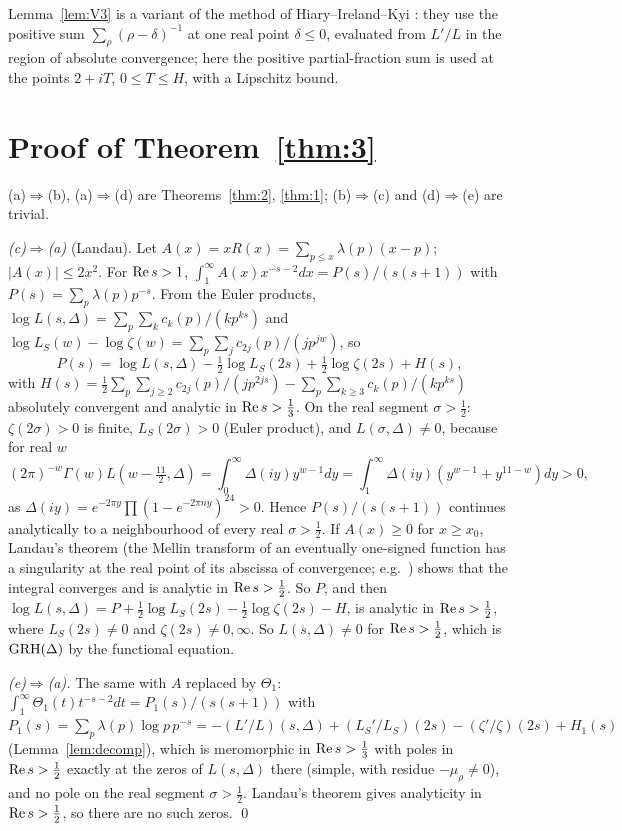 Lemma~\ref{lem:V3} is a variant of the method of Hiary--Ireland--Kyi \cite{HIK}: they use the positive sum $\sum_\rho(\rho-\delta)^{-1}$ at one real point $\delta\le0$, evaluated from $L'/L$ in the region of absolute convergence; here the positive partial-fraction sum is used at the points $2+iT$, $0\le T\le H$, with a Lipschitz bound.

\section{Proof of Theorem~\ref{thm:3}}\label{sec:proof3}

(a)$\Rightarrow$(b), (a)$\Rightarrow$(d) are Theorems~\ref{thm:2}, \ref{thm:1}; (b)$\Rightarrow$(c) and (d)$\Rightarrow$(e) are trivial.

\emph{(c)$\Rightarrow$(a)} (Landau). Let $A(x)=xR(x)=\sum_{p\le x}\lambda(p)(x-p)$; $|A(x)|\le2x^2$. For $\operatorname{Re} s>1$, $\int_1^\infty A(x)x^{-s-2}dx=P(s)/(s(s+1))$ with $P(s)=\sum_p\lambda(p)p^{-s}$. From the Euler products, $\log L(s,\Delta)=\sum_p\sum_kc_k(p)/(kp^{ks})$ and $\log L_S(w)-\log\zeta(w)=\sum_p\sum_jc_{2j}(p)/(jp^{jw})$, so
\[
P(s)=\log L(s,\Delta)-\tfrac12\log L_S(2s)+\tfrac12\log\zeta(2s)+H(s),
\]
with $H(s)=\frac12\sum_p\sum_{j\ge2}c_{2j}(p)/(jp^{2js})-\sum_p\sum_{k\ge3}c_k(p)/(kp^{ks})$ absolutely convergent and analytic in $\operatorname{Re} s>\frac13$. On the real segment $\sigma>\frac12$: $\zeta(2\sigma)>0$ is finite, $L_S(2\sigma)>0$ (Euler product), and $L(\sigma,\Delta)\ne0$, because for real $w$
\[
(2\pi)^{-w}\Gamma(w)L(w-\tfrac{11}2,\Delta)=\int_0^\infty\Delta(iy)y^{w-1}dy=\int_1^\infty\Delta(iy)(y^{w-1}+y^{11-w})dy>0,
\]
as $\Delta(iy)=e^{-2\pi y}\prod(1-e^{-2\pi ny})^{24}>0$. Hence $P(s)/(s(s+1))$ continues analytically to a neighbourhood of every real $\sigma>\frac12$. If $A(x)\ge0$ for $x\ge x_0$, Landau's theorem (the Mellin transform of an eventually one-signed function has a singularity at the real point of its abscissa of convergence; e.g.\ \cite[\S15.1]{MV}) shows that the integral converges and is analytic in $\operatorname{Re} s>\frac12$. So $P$, and then $\log L(s,\Delta)=P+\frac12\log L_S(2s)-\frac12\log\zeta(2s)-H$, is analytic in $\operatorname{Re} s>\frac12$, where $L_S(2s)\ne0$ and $\zeta(2s)\ne0,\infty$. So $L(s,\Delta)\ne0$ for $\operatorname{Re} s>\frac12$, which is $\mathrm{GRH}(\Delta)$ by the functional equation.

\emph{(e)$\Rightarrow$(a).} The same with $A$ replaced by $\Theta_1$: $\int_1^\infty\Theta_1(t)t^{-s-2}dt=P_1(s)/(s(s+1))$ with $P_1(s)=\sum_p\lambda(p)\log p\,p^{-s}=-(L'/L)(s,\Delta)+(L_S'/L_S)(2s)-(\zeta'/\zeta)(2s)+H_1(s)$ (Lemma~\ref{lem:decomp}), which is meromorphic in $\operatorname{Re} s>\frac13$ with poles in $\operatorname{Re} s>\frac12$ exactly at the zeros of $L(s,\Delta)$ there (simple, with residue $-\mu_\rho\ne0$), and no pole on the real segment $\sigma>\frac12$. Landau's theorem gives analyticity in $\operatorname{Re} s>\frac12$, so there are no such zeros. \qed

